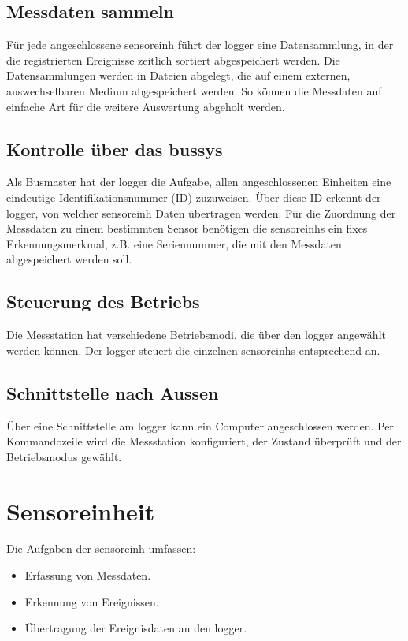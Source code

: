 \subsection{Messdaten sammeln}
Für jede angeschlossene \gls{sensoreinh} führt der \gls{logger} eine Datensammlung, in der die registrierten Ereignisse zeitlich sortiert abgespeichert werden. Die Datensammlungen werden in Dateien abgelegt, die auf einem externen, auswechselbaren Medium abgespeichert werden. So können die Messdaten auf einfache Art für die weitere Auswertung abgeholt werden.


\subsection{Kontrolle über das \gls{bussys}}
Als Busmaster hat der \gls{logger} die Aufgabe, allen angeschlossenen Einheiten eine eindeutige Identifikationsnummer (ID) zuzuweisen. Über diese ID erkennt der \gls{logger}, von welcher \gls{sensoreinh} Daten übertragen werden. Für die Zuordnung der Messdaten zu einem bestimmten Sensor benötigen die \glspl{sensoreinh} ein fixes Erkennungsmerkmal, z.B. eine Seriennummer, die mit den Messdaten abgespeichert werden soll.


\subsection{Steuerung des Betriebs}
Die Messstation hat verschiedene Betriebsmodi, die über den \gls{logger} angewählt werden können. Der \gls{logger} steuert die einzelnen \glspl{sensoreinh} entsprechend an.


\subsection{Schnittstelle nach Aussen}
Über eine Schnittstelle am \gls{logger} kann ein Computer angeschlossen werden. Per Kommandozeile wird die Messstation konfiguriert, der Zustand überprüft und der Betriebsmodus gewählt.


\section{Sensoreinheit}
Die Aufgaben der \gls{sensoreinh} umfassen:
\begin{itemize}
\item Erfassung von Messdaten.
\item Erkennung von Ereignissen.
\item Übertragung der Ereignisdaten an den \gls{logger}.
\end{itemize}

